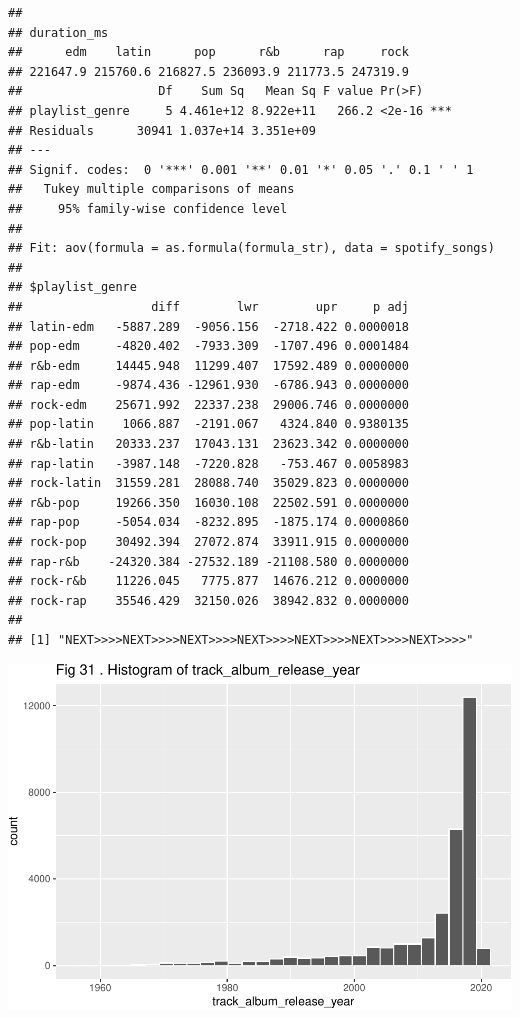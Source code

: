 \documentclass[
]{article}
\begin{document}
\begin{verbatim}
## 
## duration_ms
##      edm    latin      pop      r&b      rap     rock 
## 221647.9 215760.6 216827.5 236093.9 211773.5 247319.9 
##                   Df    Sum Sq   Mean Sq F value Pr(>F)    
## playlist_genre     5 4.461e+12 8.922e+11   266.2 <2e-16 ***
## Residuals      30941 1.037e+14 3.351e+09                   
## ---
## Signif. codes:  0 '***' 0.001 '**' 0.01 '*' 0.05 '.' 0.1 ' ' 1
##   Tukey multiple comparisons of means
##     95% family-wise confidence level
## 
## Fit: aov(formula = as.formula(formula_str), data = spotify_songs)
## 
## $playlist_genre
##                  diff        lwr        upr     p adj
## latin-edm   -5887.289  -9056.156  -2718.422 0.0000018
## pop-edm     -4820.402  -7933.309  -1707.496 0.0001484
## r&b-edm     14445.948  11299.407  17592.489 0.0000000
## rap-edm     -9874.436 -12961.930  -6786.943 0.0000000
## rock-edm    25671.992  22337.238  29006.746 0.0000000
## pop-latin    1066.887  -2191.067   4324.840 0.9380135
## r&b-latin   20333.237  17043.131  23623.342 0.0000000
## rap-latin   -3987.148  -7220.828   -753.467 0.0058983
## rock-latin  31559.281  28088.740  35029.823 0.0000000
## r&b-pop     19266.350  16030.108  22502.591 0.0000000
## rap-pop     -5054.034  -8232.895  -1875.174 0.0000860
## rock-pop    30492.394  27072.874  33911.915 0.0000000
## rap-r&b    -24320.384 -27532.189 -21108.580 0.0000000
## rock-r&b    11226.045   7775.877  14676.212 0.0000000
## rock-rap    35546.429  32150.026  38942.832 0.0000000
## 
## [1] "NEXT>>>>NEXT>>>>NEXT>>>>NEXT>>>>NEXT>>>>NEXT>>>>NEXT>>>>"
\end{verbatim}

\includegraphics{Final-Report_files/figure-latex/unnamed-chunk-14-27.pdf}
\end{document}
